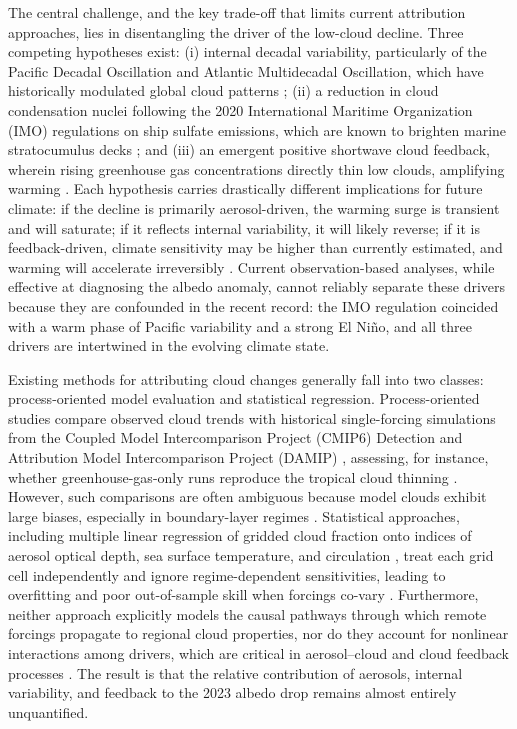 \documentclass{article}
\begin{document}
The central challenge, and the key trade-off that limits current attribution approaches, lies in disentangling the driver of the low-cloud decline. Three competing hypotheses exist: (i) internal decadal variability, particularly of the Pacific Decadal Oscillation and Atlantic Multidecadal Oscillation, which have historically modulated global cloud patterns \cite{brown2016decadal, deser2010sea}; (ii) a reduction in cloud condensation nuclei following the 2020 International Maritime Organization (IMO) regulations on ship sulfate emissions, which are known to brighten marine stratocumulus decks \cite{mccoy2017natural, manshausen2023shipping}; and (iii) an emergent positive shortwave cloud feedback, wherein rising greenhouse gas concentrations directly thin low clouds, amplifying warming \cite{zelinka2020clear, myers2021observational}. Each hypothesis carries drastically different implications for future climate: if the decline is primarily aerosol-driven, the warming surge is transient and will saturate; if it reflects internal variability, it will likely reverse; if it is feedback-driven, climate sensitivity may be higher than currently estimated, and warming will accelerate irreversibly \cite{stevens2015rethinking}. Current observation-based analyses, while effective at diagnosing the albedo anomaly, cannot reliably separate these drivers because they are confounded in the recent record: the IMO regulation coincided with a warm phase of Pacific variability and a strong El Niño, and all three drivers are intertwined in the evolving climate state.

Existing methods for attributing cloud changes generally fall into two classes: process-oriented model evaluation and statistical regression. Process-oriented studies compare observed cloud trends with historical single-forcing simulations from the Coupled Model Intercomparison Project (CMIP6) Detection and Attribution Model Intercomparison Project (DAMIP) \cite{gillett2016damip}, assessing, for instance, whether greenhouse-gas-only runs reproduce the tropical cloud thinning \cite{norris2016evidence}. However, such comparisons are often ambiguous because model clouds exhibit large biases, especially in boundary-layer regimes \cite{bony2015clouds}. Statistical approaches, including multiple linear regression of gridded cloud fraction onto indices of aerosol optical depth, sea surface temperature, and circulation \cite{lau2023robust}, treat each grid cell independently and ignore regime-dependent sensitivities, leading to overfitting and poor out-of-sample skill when forcings co-vary \cite{nowack2020causal}. Furthermore, neither approach explicitly models the causal pathways through which remote forcings propagate to regional cloud properties, nor do they account for nonlinear interactions among drivers, which are critical in aerosol–cloud and cloud feedback processes \cite{bellouin2020aerosol}. The result is that the relative contribution of aerosols, internal variability, and feedback to the 2023 albedo drop remains almost entirely unquantified.
\end{document}
